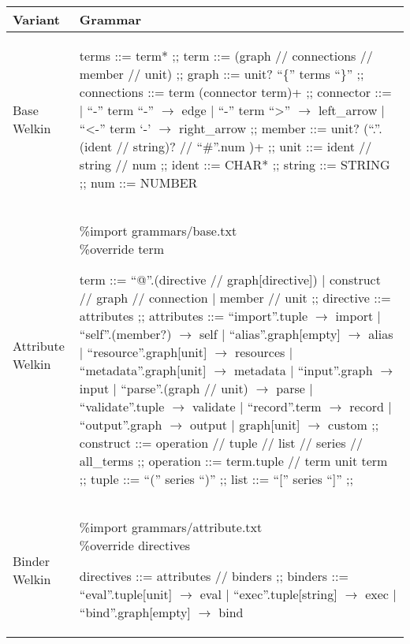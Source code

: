 
\begin{table}[hbt!]
  \centering
    \begin{tabular}{| p{1.5cm} | p{9.5cm} |}%
    \hline
    Variant & Grammar \\\hline %
      \makecell{Base \\ Welkin} &
  \begin{bnf}
  terms ::= term* ;;
  term ::= (graph // connections // member // unit) ;;
  graph ::= unit? ``\{'' terms ``\}'' ;;
  connections ::= term (connector term)+ ;;
	connector ::=
   | ``-'' term ``-'' $\to$ edge
   | ``-'' term ``>'' $\to$ left\_arrow
	 | ``<-'' term `-' $\to$ right\_arrow ;;
  member ::= unit? (``.''.(ident // string)? // ``\#''.num )+ ;;
	unit ::= ident // string // num ;;
  ident ::= CHAR* ;;
	string ::= STRING ;;
	num ::= NUMBER
\end{bnf} \\ %
   \hline
      Attribute Welkin &
  \makecell{\%import grammars/base.txt \\ \%override term}
  \begin{bnf}
  term ::= ``@''.(directive // graph[directive]) | construct // graph // connection | member // unit ;;
  directive ::= attributes ;;
  attributes ::= ``import''.tuple $\to$ import
  | ``self''.(member?) $\to$ self
  | ``alias''.graph[empty] $\to$ alias
  | ``resource''.graph[unit] $\to$ resources
  | ``metadata''.graph[unit] $\to$ metadata
  | ``input''.graph $\to$ input
  | ``parse''.(graph // unit) $\to$ parse
  | ``validate''.tuple $\to$ validate
  | ``record''.term $\to$ record
  | ``output''.graph $\to$ output
  | graph[unit] $\to$ custom ;;
  construct ::= operation // tuple // list // series // all\_terms ;;
  operation ::= term.tuple // term unit term ;;
  tuple ::= ``('' series ``)'' ;;
  list ::= ``['' series ``]'' ;;
 \end{bnf} \\
   \hline
   Binder Welkin &
\makecell{\%import grammars/attribute.txt \\ \%override directives}
    \begin{bnf}
     directives ::= attributes // binders ;;
     binders ::= ``eval''.tuple[unit] $\to$ eval
     | ``exec''.tuple[string] $\to$ exec
     | ``bind''.graph[empty] $\to$ bind
   \end{bnf} \\
    \hline
    \end{tabular}
  \end{table}


